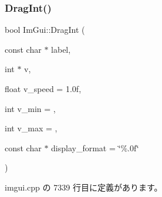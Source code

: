 \subsubsection{\texorpdfstring{Drag\+Int()}{DragInt()}}
{\footnotesize\ttfamily bool Im\+Gui\+::\+Drag\+Int (\begin{DoxyParamCaption}\item[{const char $\ast$}]{label,  }\item[{int $\ast$}]{v,  }\item[{float}]{v\+\_\+speed = {\ttfamily 1.0f},  }\item[{int}]{v\+\_\+min = {},  }\item[{int}]{v\+\_\+max = {},  }\item[{const char $\ast$}]{display\+\_\+format = {\ttfamily \char`\"{}\%.0f\char`\"{}} }\end{DoxyParamCaption})}



 imgui.\+cpp の 7339 行目に定義があります。

